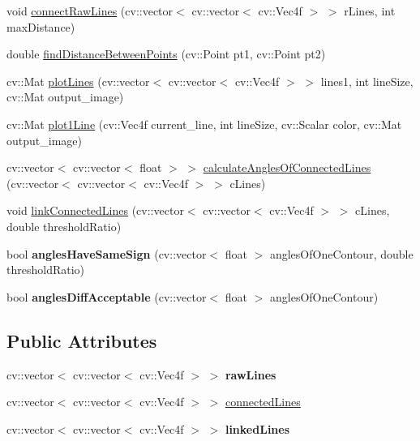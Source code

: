 \begin{DoxyCompactItemize}
\item 
void \hyperlink{classLinkedLines_a920f9ae9cb013c393a555c6c6c922d73}{connectRawLines} (cv::vector$<$ cv::vector$<$ cv::Vec4f $>$ $>$ rLines, int maxDistance)
\item 
double \hyperlink{classLinkedLines_aefaa75421b85c98299f8d4d2a956216a}{findDistanceBetweenPoints} (cv::Point pt1, cv::Point pt2)
\item 
cv::Mat \hyperlink{classLinkedLines_ada95097dbf8ad3b4f1b18b42f3920a54}{plotLines} (cv::vector$<$ cv::vector$<$ cv::Vec4f $>$ $>$ lines1, int lineSize, cv::Mat output\_\-image)
\item 
cv::Mat \hyperlink{classLinkedLines_a7696b39387ac832b1b174c484e1c5dcd}{plot1Line} (cv::Vec4f current\_\-line, int lineSize, cv::Scalar color, cv::Mat output\_\-image)
\item 
cv::vector$<$ cv::vector$<$ float $>$ $>$ \hyperlink{classLinkedLines_a96aa89f80cc4441cc4b2a4bc916c9d4a}{calculateAnglesOfConnectedLines} (cv::vector$<$ cv::vector$<$ cv::Vec4f $>$ $>$ cLines)
\item 
void \hyperlink{classLinkedLines_a8c4e2755a3b9d05a6910618578caf3d2}{linkConnectedLines} (cv::vector$<$ cv::vector$<$ cv::Vec4f $>$ $>$ cLines, double thresholdRatio)
\item 
\hypertarget{classLinkedLines_a0d59af2fa932c4ee8794cc77d49b213f}{
bool {\bfseries anglesHaveSameSign} (cv::vector$<$ float $>$ anglesOfOneContour, double thresholdRatio)}
\label{classLinkedLines_a0d59af2fa932c4ee8794cc77d49b213f}

\item 
\hypertarget{classLinkedLines_acd0687a6f9435e8e6dd09b4bb0bfa7d6}{
bool {\bfseries anglesDiffAcceptable} (cv::vector$<$ float $>$ anglesOfOneContour)}
\label{classLinkedLines_acd0687a6f9435e8e6dd09b4bb0bfa7d6}

\end{DoxyCompactItemize}
\subsection*{Public Attributes}
\begin{DoxyCompactItemize}
\item 
\hypertarget{classLinkedLines_aa2124077aa872cdbac8f3d4f47f5aecb}{
cv::vector$<$ cv::vector$<$ cv::Vec4f $>$ $>$ {\bfseries rawLines}}
\label{classLinkedLines_aa2124077aa872cdbac8f3d4f47f5aecb}

\item 
cv::vector$<$ cv::vector$<$ cv::Vec4f $>$ $>$ \hyperlink{classLinkedLines_aca22f3054cb33e024bada96faae9ca2f}{connectedLines}
\item 
\hypertarget{classLinkedLines_a26a6fd6e09564b9ed8181302db38b53f}{
cv::vector$<$ cv::vector$<$ cv::Vec4f $>$ $>$ {\bfseries linkedLines}}
\label{classLinkedLines_a26a6fd6e09564b9ed8181302db38b53f}

\end{DoxyCompactItemize}


